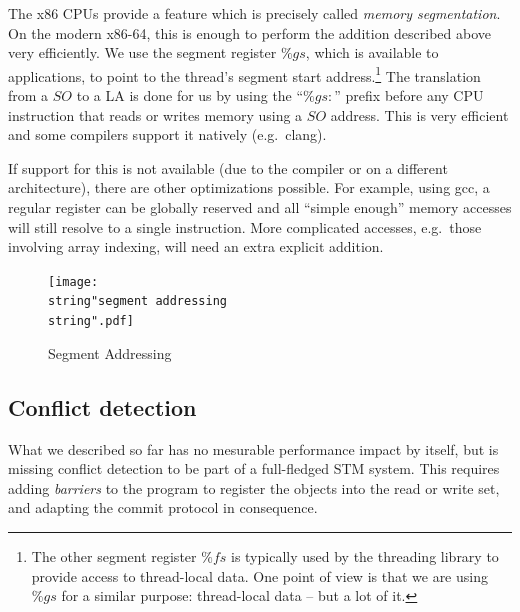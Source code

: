 \documentclass{sigplanconf}
\begin{document}
The x86 CPUs provide a feature which is precisely called \emph{memory
segmentation}.  On the modern x86-64, this is enough to perform the
addition described above very efficiently.  We use the segment register
$\%gs$, which is available to applications, to point to the
thread's segment start address.\footnote{The other segment register
$\%fs$ is typically used by the threading library to provide access to
thread-local data.  One point of view is that we are using $\%gs$ for a
similar purpose: thread-local data -- but a lot of it.}  The translation
from a $SO$ to a LA is done for us by using the ``$\%gs\colon$'' prefix
before any CPU instruction that reads or writes memory using a $SO$
address.  This is very efficient and some compilers support it natively
(e.g.\ clang).

If support for this is not available (due to the compiler or on a
different architecture), there are other optimizations possible.  For
example, using gcc, a regular register can be globally reserved and
all ``simple enough'' memory accesses will still resolve to a single
instruction.  More complicated accesses, e.g.\ those involving array
indexing, will need an extra explicit addition.

\begin{figure}[t]
  \centering
  \texttt{[image: \\string"segment addressing\\string".pdf]}
  \caption{Segment Addressing\label{fig:Segment-Addressing}}
\end{figure}


\subsection{Conflict detection}

What we described so far has no mesurable performance impact by itself,
but is missing conflict detection to be part of a full-fledged STM
system.  This requires adding \emph{barriers} to the program to register
the objects into the read or write set, and adapting the commit
protocol in consequence.
\end{document}
